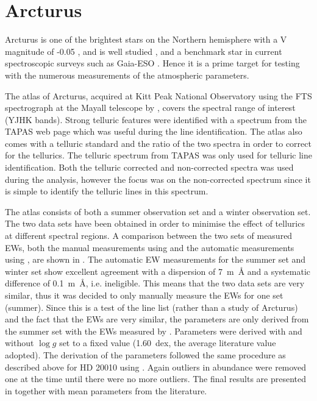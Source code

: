 \section{Arcturus}
\label{sec:arcturus}

Arcturus is one of the brightest stars on the Northern hemisphere with a V magnitude of -0.05
\citep{Ducati2002}, and is well studied \citep[see e.g.][to mention just a
few]{Griffin1967,McWilliam1990,Ramirez2013}, and a benchmark star in current spectroscopic surveys
such as Gaia-ESO \citep{Jofre2014,Smiljanic2014}. Hence it is a prime target for testing with the
numerous measurements of the atmospheric parameters.

The atlas of Arcturus, acquired at Kitt Peak National Observatory using the FTS spectrograph at the
Mayall telescope by \citet{Hinkle1995a}, covers the spectral range of interest (YJHK bands). Strong
telluric features were identified with a spectrum from the TAPAS web page \citep{Bertaux2014} which
was useful during the line identification. The atlas also comes with a telluric standard and the
ratio of the two spectra in order to correct for the tellurics. The telluric spectrum from TAPAS was
only used for telluric line identification. Both the telluric corrected and non-corrected spectra
was used during the analysis, however the focus was on the non-corrected spectrum since it is simple
to identify the telluric lines in this spectrum.

The atlas consists of both a summer observation set and a winter observation set. The two data sets
have been obtained in order to minimise the effect of tellurics at different spectral regions. A
comparison between the two sets of measured EWs, both the manual measurements using  and
the automatic measurements using , are shown in . The automatic EW
measurements for the summer set and winter set show excellent agreement with a dispersion of
\SI{7}{m\angstrom} and a systematic difference of \SI{0.1}{m\angstrom}, i.e. ineligible. This means
that the two data sets are very similar, thus it was decided to only manually measure the EWs for
one set (summer). Since this is a test of the line list (rather than a study of Arcturus) and the
fact that the EWs are very similar, the parameters are only derived from the summer set with the EWs
measured by . Parameters were derived with and without $\log g$ set to a fixed value
(\SI{1.60}{dex}, the average literature value adopted). The derivation of the parameters followed
the same procedure as described above for HD 20010 using . Again outliers in abundance
were removed one at the time until there were no more outliers. The final results are presented in
 together with mean parameters from the literature.

